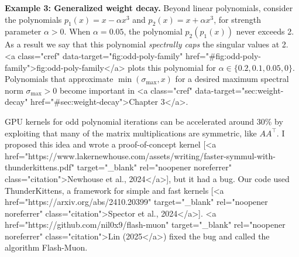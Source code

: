 \textbf{Example 3: Generalized weight decay.} Beyond linear polynomials, consider the polynomials $p_1(x) = x - \alpha x^3$ and $p_2(x) = x + \alpha x^3$, for strength parameter $\alpha > 0$. When $\alpha = 0.05$, the polynomial $p_2(p_1(x))$ never exceeds 2. As a result we say that this polynomial \textit{spectrally caps} the singular values at 2. <a class="cref" data-target="fig:odd-poly-family" href="#fig:odd-poly-family">fig:odd-poly-family</a> plots this polynomial for $\alpha \in \{0.2, 0.1, 0.05, 0\}$. Polynomials that approximate $\min(\sigma_\text{max}, x)$ for a desired maximum spectral norm $\sigma_\text{max} > 0$ become important in <a class="cref" data-target="sec:weight-decay" href="#sec:weight-decay">Chapter 3</a>.

\begin{notebox}
    GPU kernels for odd polynomial iterations can be accelerated around 30\% by exploiting that many of the matrix multiplications are symmetric, like $AA^\top$. I proposed this idea and wrote a proof-of-concept kernel [<a href="https://www.lakernewhouse.com/assets/writing/faster-symmul-with-thunderkittens.pdf" target="_blank" rel="noopener noreferrer" class="citation">Newhouse et al., 2024</a>], but it had a bug. Our code used ThunderKittens, a framework for simple and fast kernels [<a href="https://arxiv.org/abs/2410.20399" target="_blank" rel="noopener noreferrer" class="citation">Spector et al., 2024</a>]. <a href="https://github.com/nil0x9/flash-muon" target="_blank" rel="noopener noreferrer" class="citation">Lin (2025</a>) fixed the bug and called the algorithm Flash-Muon.
\end{notebox}